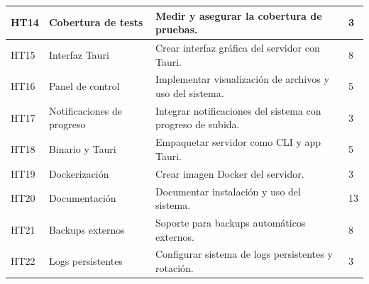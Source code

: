 \begin{tabularx}{\textwidth}{|l|l|>{\raggedright\arraybackslash}X|p{2cm}|}
    \hline
    HT14 & Cobertura de tests & Medir y asegurar la cobertura de pruebas. & 3 \\
    \hline
    HT15 & Interfaz Tauri & Crear interfaz gráfica del servidor con Tauri. & 8 \\
    \hline
    HT16 & Panel de control & Implementar visualización de archivos y uso del sistema. & 5 \\
    \hline
    HT17 & Notificaciones de progreso & Integrar notificaciones del sistema con progreso de subida. & 3 \\
    \hline
    HT18 & Binario y Tauri & Empaquetar servidor como CLI y app Tauri. & 5 \\
    \hline
    HT19 & Dockerización & Crear imagen Docker del servidor. & 3 \\
    \hline
    HT20 & Documentación & Documentar instalación y uso del sistema. & 13 \\
    \hline
    HT21 & Backups externos & Soporte para backups automáticos externos. & 8 \\
    \hline
    HT22 & Logs persistentes & Configurar sistema de logs persistentes y rotación. & 3 \\
    \hline
\end{tabularx}

